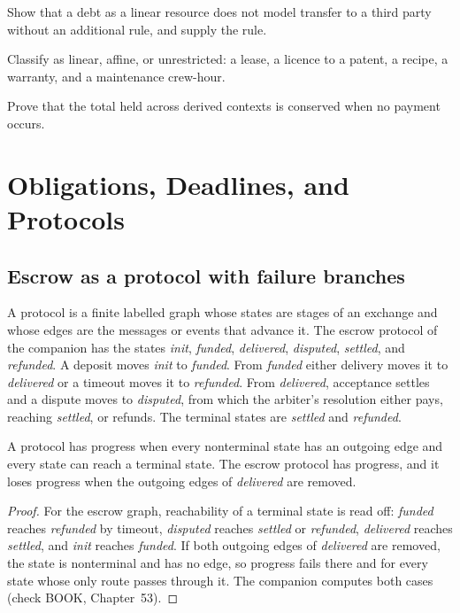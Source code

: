 \begin{exercise}Show that a debt as a linear resource does not model transfer to a third party without an additional rule, and supply the rule.\end{exercise}
\begin{exercise}Classify as linear, affine, or unrestricted: a lease, a licence to a patent, a recipe, a warranty, and a maintenance crew-hour.\end{exercise}
\begin{exercise}Prove that the total held across derived contexts is conserved when no payment occurs.\end{exercise}

\chapter{Obligations, Deadlines, and Protocols}\label{ch:53}

\section{Escrow as a protocol with failure branches}

A protocol is a finite labelled graph whose states are stages of an exchange and whose edges are the messages or events that advance it. The escrow protocol of the companion has the states \emph{init}, \emph{funded}, \emph{delivered}, \emph{disputed}, \emph{settled}, and \emph{refunded}. A deposit moves \emph{init} to \emph{funded}. From \emph{funded} either delivery moves it to \emph{delivered} or a timeout moves it to \emph{refunded}. From \emph{delivered}, acceptance settles and a dispute moves to \emph{disputed}, from which the arbiter's resolution either pays, reaching \emph{settled}, or refunds. The terminal states are \emph{settled} and \emph{refunded}.

\begin{proposition}\label{prop:progress}
A protocol has progress when every nonterminal state has an outgoing edge and every state can reach a terminal state. The escrow protocol has progress, and it loses progress when the outgoing edges of \emph{delivered} are removed.
\end{proposition}

\begin{proof}
For the escrow graph, reachability of a terminal state is read off: \emph{funded} reaches \emph{refunded} by timeout, \emph{disputed} reaches \emph{settled} or \emph{refunded}, \emph{delivered} reaches \emph{settled}, and \emph{init} reaches \emph{funded}. If both outgoing edges of \emph{delivered} are removed, the state is nonterminal and has no edge, so progress fails there and for every state whose only route passes through it. The companion computes both cases (check BOOK, Chapter~53).
\end{proof}

